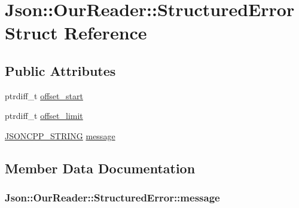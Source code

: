 \hypertarget{structJson_1_1OurReader_1_1StructuredError}{}\section{Json\+:\+:Our\+Reader\+:\+:Structured\+Error Struct Reference}
\label{structJson_1_1OurReader_1_1StructuredError}
\subsection*{Public Attributes}
\begin{DoxyCompactItemize}
\item 
ptrdiff\+\_\+t \hyperlink{structJson_1_1OurReader_1_1StructuredError_a102677698afb8177c985e72dafe72b15}{offset\+\_\+start}
\item 
ptrdiff\+\_\+t \hyperlink{structJson_1_1OurReader_1_1StructuredError_a15491a751a39c5153af04e68b1d0abb9}{offset\+\_\+limit}
\item 
\hyperlink{json_8hpp_a1e723f95759de062585bc4a8fd3fa4be}{J\+S\+O\+N\+C\+P\+P\+\_\+\+S\+T\+R\+I\+NG} \hyperlink{structJson_1_1OurReader_1_1StructuredError_a9d0b9986bf765d067dfcf2f971a450d1}{message}
\end{DoxyCompactItemize}


\subsection{Member Data Documentation}
\subsubsection[{\texorpdfstring{message}{message}}]{ Json\+::\+Our\+Reader\+::\+Structured\+Error\+::message}\hypertarget{structJson_1_1OurReader_1_1StructuredError_a9d0b9986bf765d067dfcf2f971a450d1}{}\label{structJson_1_1OurReader_1_1StructuredError_a9d0b9986bf765d067dfcf2f971a450d1}
